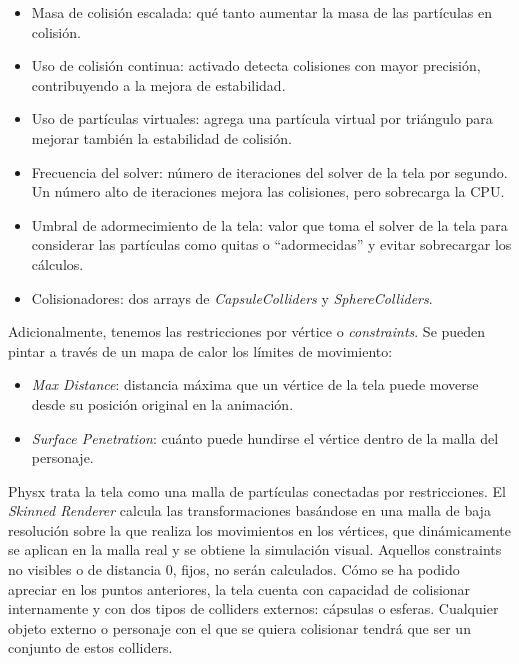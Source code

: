 \begin{itemize}
  \item Masa de colisión escalada: qué tanto aumentar la masa de las partículas en colisión.
  \item Uso de colisión continua: activado detecta colisiones con mayor precisión, contribuyendo a la mejora de estabilidad. 
  \item Uso de partículas virtuales: agrega una partícula virtual por triángulo para mejorar también la estabilidad de colisión.
  \item Frecuencia del solver: número de iteraciones del solver de la tela por segundo. Un número alto de iteraciones mejora las colisiones, pero sobrecarga la CPU.
  \item Umbral de adormecimiento de la tela: valor que toma el solver de la tela para considerar las partículas como quitas o ``adormecidas'' y evitar sobrecargar los cálculos.
  \item Colisionadores: dos arrays de \textit{CapsuleColliders} y \textit{SphereColliders}.
\end{itemize}

Adicionalmente, tenemos las restricciones por vértice o \textit{constraints}. Se pueden pintar a través de un mapa de calor los límites de movimiento:
\begin{itemize}
  \item \textit{Max Distance}: distancia máxima que un vértice de la tela puede moverse desde su posición original en la animación.
  \item \textit{Surface Penetration}: cuánto puede hundirse el vértice dentro de la malla del personaje.
\end{itemize}

Physx trata la tela como una malla de partículas conectadas por restricciones. El \textit{Skinned Renderer} calcula las transformaciones basándose en una malla de baja resolución sobre la que realiza los movimientos en los vértices, que dinámicamente se aplican en la malla real y se obtiene la simulación visual. Aquellos constraints no visibles o de distancia 0, fijos, no serán calculados. Cómo se ha podido apreciar en los puntos anteriores, la tela cuenta con capacidad de colisionar internamente y con dos tipos de colliders externos: cápsulas o esferas. Cualquier objeto externo o personaje con el que se quiera colisionar tendrá que ser un conjunto de estos colliders. \newline

